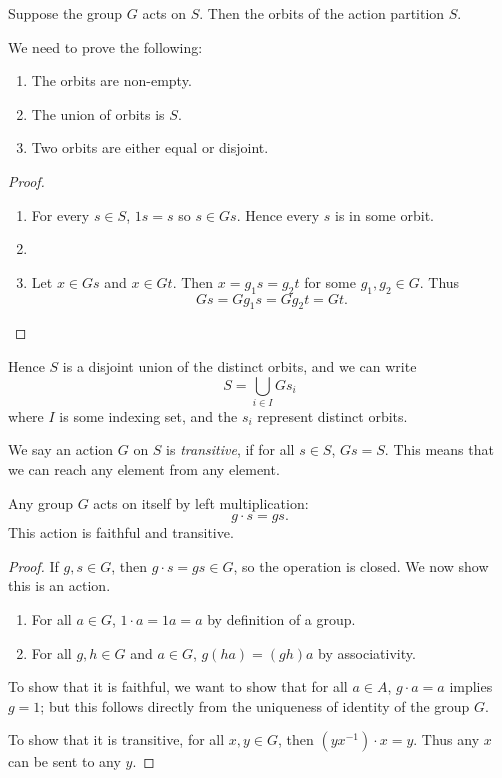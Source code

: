 \begin{lemma}
Suppose the group $G$ acts on $S$. Then the orbits of the action partition $S$.
\end{lemma}

We need to prove the following:
\begin{enumerate}[label=(\roman*)]
\item The orbits are non-empty.
\item The union of orbits is $S$.
\item Two orbits are either equal or disjoint.
\end{enumerate}

\begin{proof} \
\begin{enumerate}[label=(\roman*)]
\item For every $s\in S$, $1s=s$ so $s\in Gs$. Hence every $s$ is in some orbit.

\item 

\item Let $x\in Gs$ and $x\in Gt$. Then $x=g_1 s=g_2 t$ for some $g_1,g_2\in G$. 
Thus
\[Gs=Gg_1s=Gg_2t=Gt.\]
\end{enumerate}
\end{proof}

Hence $S$ is a disjoint union of the distinct orbits, and we can write
\[S=\bigcup_{i\in I}Gs_i\]
where $I$ is some indexing set, and the $s_i$ represent distinct orbits.

We say an action $G$ on $S$ is \emph{transitive}, if for all $s\in S$, $Gs=S$. This means that we can reach any element from any element.

\begin{example}
Any group $G$ acts on itself by left multiplication:
\[g\cdot s=gs.\]
This action is faithful and transitive.
\begin{proof}
If $g,s\in G$, then $g\cdot s=gs\in G$, so the operation is closed. We now show this is an action.
\begin{enumerate}[label=(\roman*)]
\item For all $a\in G$, $1\cdot a=1a=a$ by definition of a group.
\item For all $g,h\in G$ and $a\in G$, $g(ha)=(gh)a$ by associativity.
\end{enumerate} 

To show that it is faithful, we want to show that for all $a\in A$, $g\cdot a=a$ implies $g=1$; but this follows directly from the uniqueness of identity of the group $G$.

To show that it is transitive, for all $x,y\in G$, then $(yx^{-1})\cdot x=y$. Thus any $x$ can be sent to any $y$.
\end{proof}
\end{example}

